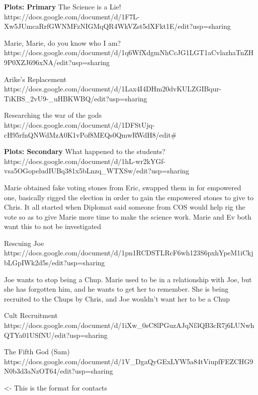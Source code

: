 \documentclass[char]{GL2020}
\begin{document}
\textbf{Plots: Primary}
The Science is a Lie!
https://docs.google.com/document/d/1F7L-Xw5JUmcaRrfGWNMFzNIGMqQR4WkVZst5dXFkt1E/edit?usp=sharing

Marie, Marie, do you know who I am?
https://docs.google.com/document/d/1q6WfXdgmNhCcJG1LGT1aCvlazhaTnZH9P0XZJ696xNA/edit?usp=sharing

Arike's Replacement
https://docs.google.com/document/d/1Lax4I4DHm20dvKULZGIBqur-TiKBS_2vU9-_uHBKWBQ/edit?usp=sharing

Researching the war of the gods
https://docs.google.com/document/d/1DFStUjq-cH95rfnQNWdMzA0K1vPof8MEQs0QmwRWdH8/edit#

\textbf{Plots: Secondary}
What happened to the students?
https://docs.google.com/document/d/1hL-wr2kYGf-vsa5OGopeludIUBq381x5bLnzq_WTXSw/edit?usp=sharing

Marie obtained fake voting stones from Eric, swapped them in for empowered one, basically rigged the election in order to gain the empowered stones to give to Chris.  It all started when Diplomat said someone from COS \cEvil{} would help rig the vote so as to give Marie more time to make the science work.  Marie and Ev both want this to not be investigated

Rescuing Joe
https://docs.google.com/document/d/1pn1RCDSTLRcF6wh123S6pxhYpeM1iCkjbLGpIWk2d5s/edit?usp=sharing

Joe wants to stop being a Chup.  Marie used to be in a relationship with Joe, but she has forgotten him, and he wants to get her to remember.  She is being recruited to the Chups by Chris, and Joe wouldn't want her to be a Chup

Cult Recruitment
https://docs.google.com/document/d/1iXw_0sC8lPGuzAJqNf3QB3cR7j6LUNwhQTYa01USfNU/edit?usp=sharing

The Fifth God (Sam)
https://docs.google.com/document/d/1V_DgaQyGExLYW5a84tViupfFEZCHG9N0b3d3aNzOT64/edit?usp=sharing

\begin{itemz}[Goals]
	\item 
\end{itemz}

\begin{itemz}[Notes]
	\item 
\end{itemz}

\begin{contacts}
	\contact{\cTest{}} <- This is the format for contacts 
\end{contacts}
\end{document}
